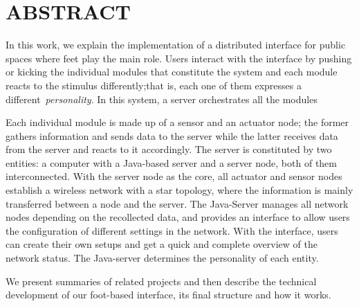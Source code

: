 \section{ABSTRACT}
In this work, we explain the implementation of a distributed interface for public spaces where feet play the main role. Users interact with the interface by pushing or kicking the individual modules that constitute the system and each module reacts to the stimulus differently;that is, each one of them expresses a different~\emph{personality}. In this system, a server orchestrates all the modules 

Each individual module is made up of a sensor and an actuator node; the former gathers information and sends data to the server while the latter receives data from the server and reacts to it accordingly. The server is constituted by two entities: a computer with a Java-based server and a server node, both of them interconnected. With the server node as the core, all actuator and sensor nodes establish a wireless network with a star topology, where the information is mainly transferred between a node and the server. The Java-Server manages all network nodes depending on the recollected data, and provides an interface to allow users the configuration of different settings in the network. With the interface, users can create their own setups and get a quick and complete overview of the network status. The Java-server determines the personality of each entity. 

We present summaries of related projects and then describe the technical development of our foot-based interface, its final structure and how it works. 

